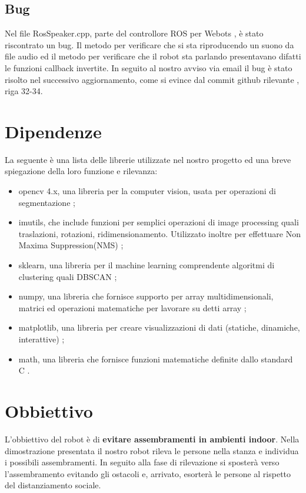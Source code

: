 \documentclass[a4paper]{article}
\begin{document}
	\subsection{Bug}\label{sec:Bug}
	Nel file RosSpeaker.cpp, parte del controllore ROS per Webots \cite{cyberbotics}, è stato riscontrato un bug. Il metodo per verificare che si sta riproducendo un suono da file audio ed il metodo per verificare che il robot sta parlando presentavano difatti le funzioni callback invertite. In seguito al nostro avviso via email il bug è stato risolto nel successivo aggiornamento, come si evince dal commit github rilevante \cite{rosbug}, riga 32-34.
	
	\section{Dipendenze}\label{sec:Dipendenze} 
	La seguente è una lista delle librerie utilizzate nel nostro progetto ed una breve spiegazione della loro funzione e rilevanza:
	
	\begin{itemize}
		\item opencv 4.x, una libreria per la computer vision, usata per operazioni di segmentazione \cite{opencv};
		\item imutils, che include funzioni per semplici operazioni di image processing quali traslazioni, rotazioni, ridimensionamento. Utilizzato inoltre per effettuare Non Maxima Suppression(NMS) \cite{imutils};
		\item sklearn, una libreria per il machine learning comprendente algoritmi di clustering quali DBSCAN \cite{scikit};
		\item numpy, una libreria che fornisce supporto per array multidimensionali, matrici ed operazioni matematiche per lavorare su detti array \cite{numpy};
		\item matplotlib, una libreria per creare visualizzazioni di dati (statiche, dinamiche, interattive) \cite{matplotlib};
		\item math, una libreria che fornisce funzioni matematiche definite dallo standard C \cite{math}.
	\end{itemize}

	\section{Obbiettivo}\label{sec:Obbiettivo} 
	L'obbiettivo del robot è di \textbf{evitare assembramenti in ambienti indoor}. \newline
	Nella dimostrazione presentata il nostro robot rileva le persone nella stanza e individua i possibili assembramenti. In seguito alla fase di rilevazione si sposterà verso l'assembramento evitando gli ostacoli e, arrivato, esorterà le persone al rispetto del distanziamento sociale.
	
\end{document}
